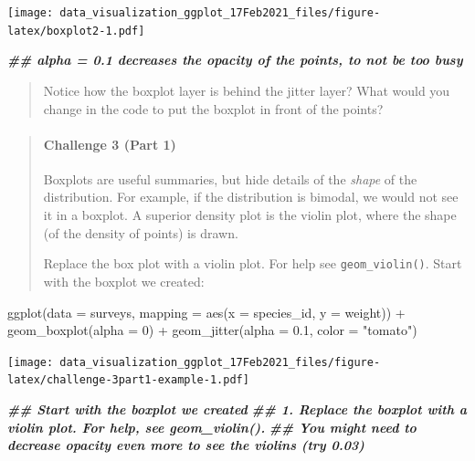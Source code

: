 \documentclass[
]{article}
\newenvironment{Shaded}{\begin{snugshade}}{\end{snugshade}}
\newcommand{\AttributeTok}[1]{\textcolor[rgb]{0.77,0.63,0.00}{#1}}
\newcommand{\DecValTok}[1]{\textcolor[rgb]{0.00,0.00,0.81}{#1}}
\newcommand{\DocumentationTok}[1]{\textcolor[rgb]{0.56,0.35,0.01}{\textbf{\textit{#1}}}}
\newcommand{\FloatTok}[1]{\textcolor[rgb]{0.00,0.00,0.81}{#1}}
\newcommand{\FunctionTok}[1]{\textcolor[rgb]{0.00,0.00,0.00}{#1}}
\newcommand{\NormalTok}[1]{#1}
\newcommand{\SpecialCharTok}[1]{\textcolor[rgb]{0.00,0.00,0.00}{#1}}
\newcommand{\StringTok}[1]{\textcolor[rgb]{0.31,0.60,0.02}{#1}}
\begin{document}
\texttt{[image: data\_visualization\_ggplot\_17Feb2021\_files/figure-latex/boxplot2-1.pdf]}

\begin{Shaded}
\begin{Highlighting}[]
\DocumentationTok{\#\# alpha = 0.1 decreases the opacity of the points, to not be too busy}
\end{Highlighting}
\end{Shaded}

\begin{quote}
Notice how the boxplot layer is behind the jitter layer? What would you
change in the code to put the boxplot in front of the points?
\end{quote}

\begin{quote}
\mbox{}%
\hypertarget{challenge-3-part-1}{%
\paragraph{Challenge 3 (Part 1)}\label{challenge-3-part-1}}

Boxplots are useful summaries, but hide details of the \emph{shape} of
the distribution. For example, if the distribution is bimodal, we would
not see it in a boxplot. A superior density plot is the violin plot,
where the shape (of the density of points) is drawn.

Replace the box plot with a violin plot. For help see
\texttt{geom\_violin()}. Start with the boxplot we created:
\end{quote}

\begin{Shaded}
\begin{Highlighting}[]
\FunctionTok{ggplot}\NormalTok{(}\AttributeTok{data =}\NormalTok{ surveys, }\AttributeTok{mapping =} \FunctionTok{aes}\NormalTok{(}\AttributeTok{x =}\NormalTok{ species\_id, }\AttributeTok{y =}\NormalTok{ weight)) }\SpecialCharTok{+}
  \FunctionTok{geom\_boxplot}\NormalTok{(}\AttributeTok{alpha =} \DecValTok{0}\NormalTok{) }\SpecialCharTok{+}
  \FunctionTok{geom\_jitter}\NormalTok{(}\AttributeTok{alpha =} \FloatTok{0.1}\NormalTok{, }\AttributeTok{color =} \StringTok{"tomato"}\NormalTok{)}
\end{Highlighting}
\end{Shaded}

\texttt{[image: data\_visualization\_ggplot\_17Feb2021\_files/figure-latex/challenge-3part1-example-1.pdf]}

\begin{Shaded}
\begin{Highlighting}[]
\DocumentationTok{\#\#  Start with the boxplot we created}
\DocumentationTok{\#\#  1. Replace the boxplot with a violin plot. For help, see geom\_violin().}
\DocumentationTok{\#\#  You might need to decrease opacity even more to see the violins (try 0.03)}
\end{Highlighting}
\end{Shaded}
\end{document}
